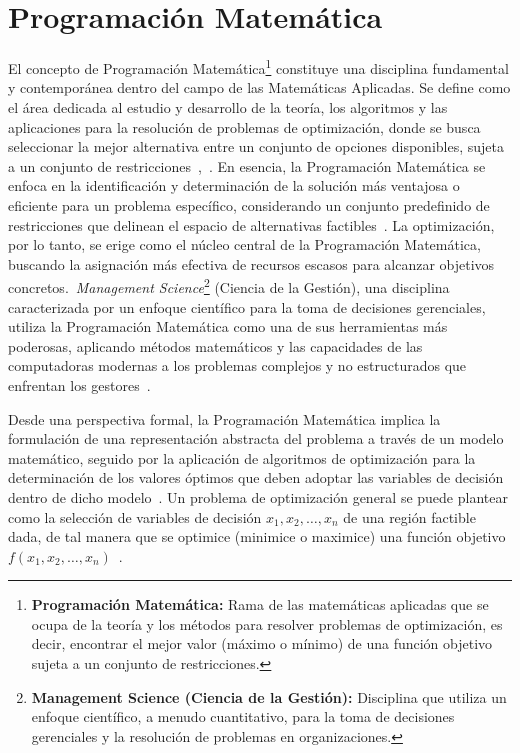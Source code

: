 \section{Programación Matemática}


El concepto de Programación Matemática\footnote{\textbf{Programación Matemática:} Rama de las matemáticas aplicadas que se ocupa de la teoría y los métodos para resolver problemas de optimización, es decir, encontrar el mejor valor (máximo o mínimo) de una función objetivo sujeta a un conjunto de restricciones.} constituye una disciplina fundamental y contemporánea dentro del campo de las Matemáticas Aplicadas. Se define como el área dedicada al estudio y desarrollo de la teoría, los algoritmos y las aplicaciones para la resolución de problemas de optimización, donde se busca seleccionar la mejor alternativa entre un conjunto de opciones disponibles, sujeta a un conjunto de restricciones~\cite[p.~1]{sinha2006},~\cite[p.~1]{luenberger1984}. En esencia, la Programación Matemática se enfoca en la identificación y determinación de la solución más ventajosa o eficiente para un problema específico, considerando un conjunto predefinido de restricciones que delinean el espacio de alternativas factibles~\cite[p.~1]{sinha2006}. La optimización, por lo tanto, se erige como el núcleo central de la Programación Matemática, buscando la asignación más efectiva de recursos escasos para alcanzar objetivos concretos.\ \textit{Management Science}\footnote{\textbf{Management Science (Ciencia de la Gestión):} Disciplina que utiliza un enfoque científico, a menudo cuantitativo, para la toma de decisiones gerenciales y la resolución de problemas en organizaciones.} (Ciencia de la Gestión), una disciplina caracterizada por un enfoque científico para la toma de decisiones gerenciales, utiliza la Programación Matemática como una de sus herramientas más poderosas, aplicando métodos matemáticos y las capacidades de las computadoras modernas a los problemas complejos y no estructurados que enfrentan los gestores~\cite[p.~1]{bradley1977applied}.

Desde una perspectiva formal, la Programación Matemática implica la formulación de una representación abstracta del problema a través de un modelo matemático, seguido por la aplicación de algoritmos de optimización para la determinación de los valores óptimos que deben adoptar las variables de decisión dentro de dicho modelo~\cite[p.~175]{bertsekas1999}. Un problema de optimización general se puede plantear como la selección de variables de decisión $x_1, x_2, \ldots, x_n$ de una región factible dada, de tal manera que se optimice (minimice o maximice) una función objetivo $f(x_1, x_2, \ldots, x_n)$~\cite[p.~410]{nocedal2006}.


